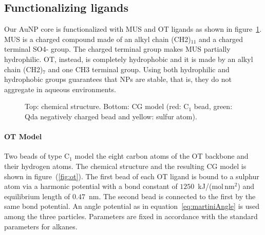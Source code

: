 \subsection{Functionalizing ligands}
Our \ac{AuNP} core is functionalized with \ac{MUS} and \ac{OT} ligands as shown in figure~\ref{fig:figands}. 
\ac{MUS} is a charged compound made of an alkyl chain (\acs{CH2})$_{11}$ and a charged terminal \acs{SO4-} group. 
The charged terminal group makes \ac{MUS} partially hydrophilic. \ac{OT}, instead, is completely hydrophobic and 
it is made by an alkyl chain (\acs{CH2})$_{7}$ and one \acs{CH3} terminal group. Using both hydrophilic and 
hydrophobic groups guarantees that \acp{NP} are stable, that is, they do not aggregate in aqueous environments.
\begin{figure}[!ht]
	\centering
	\qquad\qquad%
	\caption{Top: chemical structure. Bottom: \acs{CG} \martini model (red: C$_1$ bead, green: Qda negatively charged bead and yellow: sulfur atom).}
	\label{fig:figands}
\end{figure}

\paragraph{\textbf{OT Model}} Two \martini beads of type C$_1$ model the eight carbon atoms of the \ac{OT} 
backbone and their hydrogen atoms. The chemical structure and the resulting \ac{CG} \martini model is shown in 
figure~(\ref{fig:ot}). The first bead of each \ac{OT} ligand is bound to a sulphur atom via a harmonic potential 
with a bond constant of $1250$~kJ/(mol\,nm$^2$) and equilibrium length of $0.47$~nm. The second bead is connected 
to the first by the same bond potential. An angle potential as in equation~\eqref{eq:martiniAngle} is used among 
the three particles. Parameters are fixed in accordance with the standard \martini parameters for alkanes. 

